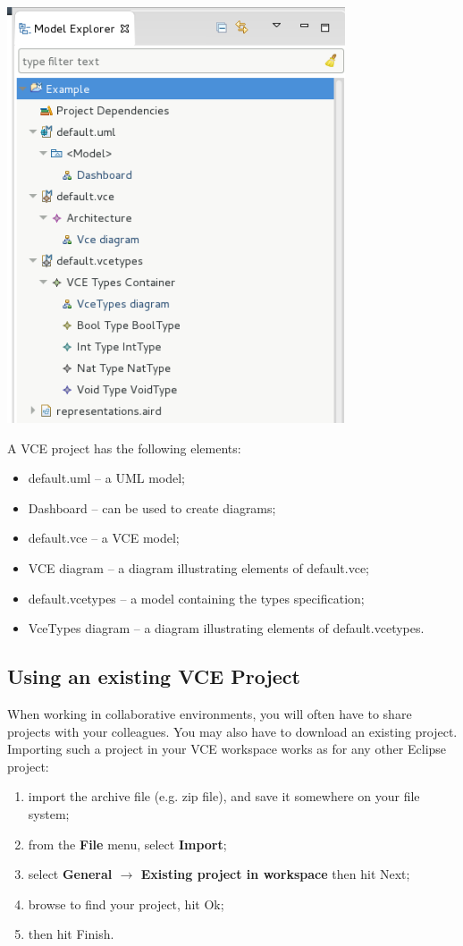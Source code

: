 \documentclass[12pt]{article}
\begin{document}
     \centerline{
     \includegraphics[width=10cm]{draws/vce-proj.png}
     \label{fig:vce-proj}
     }
 
A VCE project has the following elements:
\begin{itemize}
\item
default.uml -- a UML model;
\item
Dashboard -- can be used to create diagrams;
\item
default.vce -- a VCE model;
\item
VCE diagram -- a diagram illustrating elements of default.vce;
\item
default.vcetypes -- a model containing the types specification;
\item
VceTypes diagram -- a diagram illustrating elements of default.vcetypes.
\end{itemize}

\subsection{Using an existing VCE Project }
When working in collaborative environments, you will often have to share projects with your colleagues. You may also have to download an existing project. Importing such a project in your VCE workspace works as for any other Eclipse project:
\begin{enumerate}
\item
import the archive file (e.g. zip file), and save it somewhere on your file system;
\item
from the \textbf{File} menu, select \textbf{Import};
\item
select \textbf{General $\rightarrow$ Existing project in workspace} then hit Next;
\item
browse to find your project, hit Ok;
\item
then hit Finish.
\end{enumerate}
\end{document}
